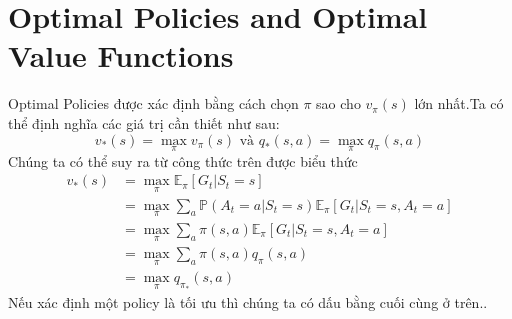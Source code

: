 \documentclass[12pt,a4paper]{article}
\begin{document}
\section{Optimal Policies and Optimal Value Functions}
Optimal Policies được xác định bằng cách chọn $\pi$ sao cho $v_\pi(s)$ lớn nhất.Ta có thể định nghĩa các giá trị cần thiết như sau:
\begin{equation*}
    v_*(s) = \max_{\pi}v_\pi (s) \text{  và  }q_*(s,a) = \max_\pi q_\pi(s,a)
\end{equation*}
Chúng ta có thể suy ra từ công thức trên được biểu thức
\begin{align*}
    v_*(s) & = \max_{\pi}\mathbb{E}_\pi[G_t|S_t = s] \\
    &=\max_{\pi}\sum_{a}\mathbb{P}(A_t = a|S_t=s)\mathbb{E}_\pi[G_t|S_t = s,A_t=a]\\
    &=\max_{\pi}\sum_{a}\pi(s,a)\mathbb{E}_\pi[G_t|S_t = s,A_t=a]\\
    &=\max_{\pi}\sum_{a}\pi(s,a)q_\pi(s,a)\\
    &=\max_{\pi}q_{\pi_*}(s,a)
\end{align*}
Nếu xác định một policy là tối ưu thì chúng ta có dấu bằng cuối cùng ở trên..
\end{document}
